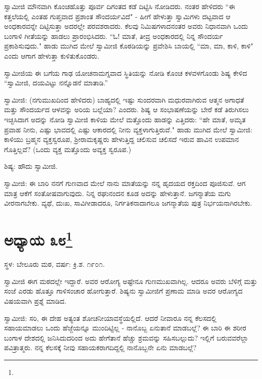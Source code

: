ಸ್ವಾಮೀಜಿ ಮೌನವಾಗಿ ಕೊಂಚಹೊತ್ತು ಪೂರ್ವ ದಿಗಂತದ ಕಡೆ ದಿಟ್ಟಿಸಿ ನೋಡಿದರು. ನಂತರ ಹೇಳಿದರು “ಈ ಕತ್ತಲೆಯಲ್ಲಿ ಎಂತಹ ಗುಪ್ತವಾದ ಪ್ರಶಾಂತ ಸೌಂದರ್ಯವಿದೆ" - ಹೀಗೆ ಹೇಳುತ್ತಾ ಸ್ವಾಮಿಗಳು ದಟ್ಟವಾದ ಆ ಅಂಧಕಾರವನ್ನೇ ದಿಟ್ಟಿಸುತ್ತಾ ಅದರಲ್ಲೇ ಪರವಶರಾದರು. ಕೆಲವು ನಿಮಿಷಗಳಾದನಂತರ ಅವರು ನಿಧಾನವಾಗಿ ಒಂದು ಬಂಗಾಳಿ ಗೀತೆಯನ್ನು ಹಾಡಲು ಪ್ರಾರಂಭಿಸಿದರು. “ಓ! ಮಾತೆ, ತೀವ್ರ ಅಂಧಕಾರದಲ್ಲಿ ನಿನ್ನ ಸೌಂದರ್ಯ ಪ್ರಕಾಶಿಸುವುದು." ಹಾಡು ಮುಗಿದ ಮೇಲೆ ಸ್ವಾಮೀಜಿ ಕೊಠಡಿಯನ್ನು ಪ್ರವೇಶಿಸಿ ಬಾಯಲ್ಲಿ “ಮಾ, ಮಾ, ಕಾಳಿ, ಕಾಳಿ" ಎಂದು ಆಗಾಗ ಹೇಳುತ್ತಾ ಕುಳಿತುಕೊಂಡರು.

ಸ್ವಾಮೀಜಿಯ ಈ ಬಗೆಯ ಗಾಢ ಯೋಚನಾಮಗ್ನವಾದ ಸ್ಥಿತಿಯನ್ನು ನೋಡಿ ಕೊಂಚ ಕಳವಳಗೊಂಡು ಶಿಷ್ಯ ಕೇಳಿದ “ಸ್ವಾಮೀಜಿ, ದಯವಿಟ್ಟು ನನ್ನೊಡನೆ ಮಾತಾಡಿ.”

ಸ್ವಾಮೀಜಿ: (ನಗುಮುಖದಿಂದ ಹೇಳಿದರು) ಬಾಹ್ಯದಲ್ಲಿ ಇಷ್ಟು ಸುಂದರವಾಗಿ ಮಧುರವಾಗಿರುವ ಆತ್ಮನ ಅಗಾಧತೆ ಮತ್ತು ಸೌಂದರ್ಯದ ಆಳವನ್ನು ಅರಿಯ ಬಲ್ಲೆಯಾ? ಎಂದರು. ಶಿಷ್ಯ ಆ ಸಂಭಾಷಣೆಯನ್ನು ಬೇರೆ ಕಡೆ ತಿರುಗಿಸಲು ಇಚ್ಛಿಸಿದಾಗ ಅದನ್ನು ನೋಡಿ ಸ್ವಾಮೀಜಿ ಕಾಳಿಯ ಮೇಲೆ ಮತ್ತೊಂದು ಹಾಡನ್ನು ಎತ್ತಿದರು: “ಹೇ ಮಾತೆ, ಅಮೃತ ಪ್ರವಾಹ ನೀನು, ಎಷ್ಟು ಭಾವದಲ್ಲಿ ಎಷ್ಟು ಆಕಾರದಲ್ಲಿ ನೀನು ವ್ಯಕ್ತಳಾಗುತ್ತಿರುವೆ." ಹಾಡು ಮುಗಿದ ಮೇಲೆ ಸ್ವಾಮೀಜಿ: ಕಾಳಿಯು ಬ್ರಹ್ಮನ ವ್ಯಕ್ತಸ್ವರೂಪ, ಶ‍್ರೀರಾಮಕೃಷ್ಣರು ಹೇಳುತ್ತಿದ್ದ ಚಲಿಸುವ ಚಲಿಸದೆ ಇರುವ ಹಾವಿನ ಉಪಮಾನ ಗೊತ್ತಿಲ್ಲವೆ? (ಒಂದು ವ್ಯಕ್ತ ಮತ್ತೊಂದು ಅವ್ಯಕ್ತ ಸ್ವರೂಪ.)

ಶಿಷ್ಯ: ಹೌದು ಸ್ವಾಮೀಜಿ.

ಸ್ವಾಮೀಜಿ: ಈ ಬಾರಿ ನನಗೆ ಗುಣವಾದ ಮೇಲೆ ನಾನು ಮಾತೆಯನ್ನು ನನ್ನ ಹೃದಯದ ರಕ್ತದಿಂದ ಪೂಜಿಸುವೆ. ಆಗ ಮಾತ್ರ ಆಕೆಗೆ ಸಂತೋಷವಾಗುವುದು. ನಿನ್ನ ರಘುನಂದನ ಕೂಡ ಅದನ್ನು ಹೇಳುತ್ತಾನೆ. ಜಗನ್ಮಾತೆಯ ಮಗು ವೀರನಾಗಬೇಕು. ವ್ಯಥೆ, ದುಃಖ, ಸಾವಿಗೀಡಾದರೂ, ನಿರ್ಗತಿಕನಾದಾಗಲೂ ಜಗನ್ಮಾತೆಯ ಪುತ್ರ ನಿರ್ಭಯನಾಗಿರಬೇಕು.

\newpage

\chapter[ಅಧ್ಯಾಯ ೩೮]{ಅಧ್ಯಾಯ ೩೮\protect\footnote{}}

\begin{center}
ಸ್ಥಳ: ಬೇಲೂರು ಮಠ, ವರ್ಷ: ಕ್ರಿ.ಶ. ೧೯೦೧.
\end{center}

ಸ್ವಾಮೀಜಿ ಈಗ ಮಠದಲ್ಲೇ ಇದ್ದಾರೆ. ಅವರ ಆರೋಗ್ಯ ಅಷ್ಟೇನೂ ಗುಣಮುಖವಾಗಿಲ್ಲ. ಆದರೂ ಅವರು ಬೆಳಿಗ್ಗೆ ಮತ್ತು ಸಂಜೆ ಎರಡು ಹೊತ್ತೂ ಗಾಳಿಸಂಚಾರ ಹೋಗುತ್ತಾರೆ. ಶಿಷ್ಯನು ಸ್ವಾಮೀಜಿಗೆ ಪ್ರಣಾಮ ಮಾಡಿ ಅವರ ಆರೋಗ್ಯದ ವಿಷಯವಾಗಿ ಪ್ರಶ್ನೆ ಮಾಡಿದ.

ಸ್ವಾಮೀಜಿ: ಸರಿ, ಈ ದೇಹ ಅತ್ಯಂತ ಶೋಚನೀಯಾವಸ್ಥೆಯಲ್ಲಿದೆ. ಆದರೆ ನೀವಾರೂ ನನ್ನ ಕೆಲಸದಲ್ಲಿ ಸಹಾಯಮಾಡಲು ಒಂದು ಹೆಜ್ಜೆಯನ್ನೂ ಮುಂದಿಟ್ಟಿಲ್ಲ - ನಾನೊಬ್ಬ ಏನುತಾನೆ ಮಾಡಬಲ್ಲೆ? ಈ ಬಾರಿ ಈ ಶರೀರ ಬಂಗಾಳ ದೇಶದಲ್ಲಿ ಜನಿಸಿದುದರಿಂದ ಅದು ಹೇಗೆತಾನೆ ಹೆಚ್ಚು ಶ್ರಮವನ್ನು ಸಹಿಸಬಲ್ಲುದು? ಇಲ್ಲಿಗೆ ಬರುವವರೆಲ್ಲಾ ಪವಿತ್ರಾತ್ಮರು. ನನ್ನ ಕೆಲಸಕ್ಕೆ ನೀವು ಸಹಾಯಕರಾಗದಿದ್ದಲ್ಲಿ ನಾನೊಬ್ಬನೇ ಏನು ಮಾಡಬಲ್ಲೆ?

